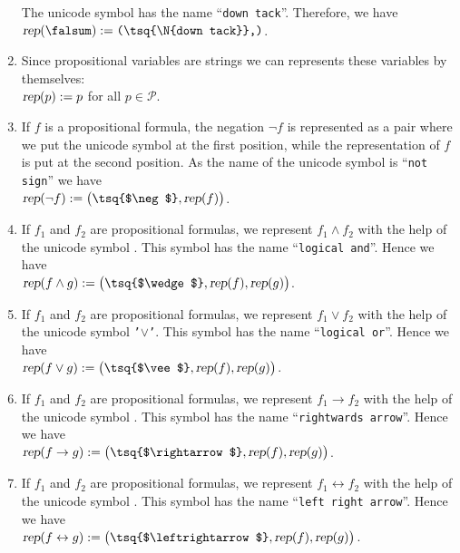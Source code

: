 \begin{enumerate}
      The unicode symbol \texttt{\tsq{$\falsum$}} has the name ``\texttt{down tack}''.
      Therefore, we have
      \\[0.2cm]
      \hspace*{1.3cm}
      $\textsl{rep}(\falsum) := \texttt{(\tsq{\symbol{92}N\{down tack\}},)}$.
\item Since propositional variables are strings we can represents these variables by themselves:
      \\[0.2cm]
      \hspace*{1.3cm}
      $\textsl{rep}(p) := p$ \quad for all $p \in \mathcal{P}$.
\item If $f$ is a propositional formula, the  negation $\neg f$ is represented as a pair where
      we put the unicode symbol \texttt{\tsq{$\neg$}} at the first position, while the representation of $f$ is put
      at the second position.  As the name of the unicode symbol \texttt{\tsq{$\neg$}} is
      ``\texttt{not sign}'' we have
      \\[0.2cm]
      \hspace*{1.3cm} 
      $\textsl{rep}(\neg f) := \bigl(\texttt{\tsq{$\neg$}}, \textsl{rep}(f)\bigr)$.
\item If $f_1$ and $f_2$ are propositional formulas, we represent $f_1 \wedge f_2$ with the help of the
      unicode symbol \texttt{\tsq{$\wedge$}}.  This symbol has the name ``\texttt{logical and}''.  Hence we have
      \\[0.2cm]
      \hspace*{1.3cm} 
      $\textsl{rep}(f \wedge g) := \bigl(\texttt{\tsq{$\wedge$}}, \textsl{rep}(f), \textsl{rep}(g)\bigr)$.
\item If $f_1$ and $f_2$ are propositional formulas, we represent $f_1 \vee f_2$ with the help of the unicode symbol
      \texttt{'$\vee$'}. This symbol has the name ``\texttt{logical or}''.  Hence we have
      \\[0.2cm]
      \hspace*{1.3cm} 
      $\textsl{rep}(f \vee g) := \bigl(\texttt{\tsq{$\vee$}}, \textsl{rep}(f), \textsl{rep}(g)\bigr)$.
\item If $f_1$ and $f_2$ are propositional formulas, we represent $f_1 \rightarrow f_2$ with the help of the
      unicode symbol \texttt{\tsq{$\rightarrow$}}.  This symbol has the name ``\texttt{rightwards arrow}''.
      Hence we have
      \\[0.2cm]
      \hspace*{1.3cm} 
      $\textsl{rep}(f \rightarrow g) := \bigl(\texttt{\tsq{$\rightarrow$}}, \textsl{rep}(f), \textsl{rep}(g)\bigr)$.
\item If $f_1$ and $f_2$ are propositional formulas, we represent $f_1 \leftrightarrow f_2$ with the help of
      the unicode symbol \texttt{\tsq{$\leftrightarrow$}}.  This symbol has the name ``\texttt{left right arrow}''.
      Hence we have
      \\[0.2cm]
      \hspace*{1.3cm} 
      $\textsl{rep}(f \leftrightarrow g) := \bigl(\texttt{\tsq{$\leftrightarrow$}}, \textsl{rep}(f), \textsl{rep}(g)\bigr)$.
\end{enumerate}
